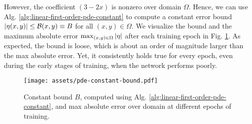     However, the coefficient $(3-2x)$ is nonzero over domain $\Omega$.
    Hence, we can use Alg. \ref{alg:linear-first-order-pde-constant} to compute a constant error bound $|\eta(x, y)| \leq \mathcal{B}(x, y) \equiv B$ for all $(x, y) \in \Omega$.
    We visualize the bound and the maximum absolute error $\max_{(x, y)\in\Omega}|\eta|$ after each training epoch in Fig. \ref{fig:pde-constant-bound}.
    As expected, the bound is loose, which is about an order of magnitude larger than the max absolute error.
    Yet, it consistently holds true for every epoch, even during the early stages of training, when the network performs poorly.
    \begin{figure}[!ht]
        \centering
        \texttt{[image: assets/pde-constant-bound.pdf]}
        \caption{
            Constant bound $B$, computed using Alg. \ref{alg:linear-first-order-pde-constant}, and max absolute error over domain at different epochs of training.
        }\label{fig:pde-constant-bound}
    \end{figure}